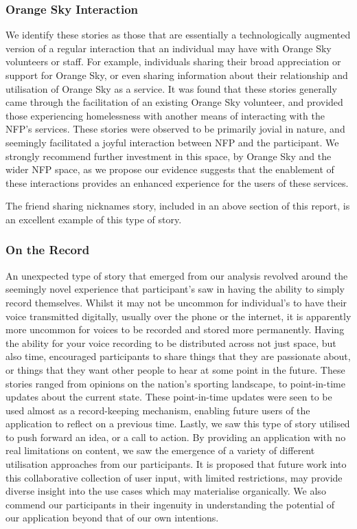 \subsubsection{Orange Sky Interaction}

We identify these stories as those that are essentially a technologically augmented version of a regular interaction that an individual may have with Orange Sky volunteers or staff. For example, individuals sharing their broad appreciation or support for Orange Sky, or even sharing information about their relationship and utilisation of Orange Sky as a service. It was found that these stories generally came through the facilitation of an existing Orange Sky volunteer, and provided those experiencing homelessness with another means of interacting with the NFP's services. These stories were observed to be primarily jovial in nature, and seemingly facilitated a joyful interaction between NFP and the participant. We strongly recommend further investment in this space, by Orange Sky and the wider NFP space, as we propose our evidence suggests that the enablement of these interactions provides an enhanced experience for the users of these services.

The friend sharing nicknames story, included in an above section of this report, is an excellent example of this type of story.

\subsubsection{On the Record}

An unexpected type of story that emerged from our analysis revolved around the seemingly novel experience that participant's saw in having the ability to simply record themselves. Whilst it may not be uncommon for individual's to have their voice transmitted digitally, usually over the phone or the internet, it is apparently more uncommon for voices to be recorded and stored more permanently. Having the ability for your voice recording to be distributed across not just space, but also time, encouraged participants to share things that they are passionate about, or things that they want other people to hear at some point in the future. These stories ranged from opinions on the nation's sporting landscape, to point-in-time updates about the current state. These point-in-time updates were seen to be used almost as a record-keeping mechanism, enabling future users of the application to reflect on a previous time. Lastly, we saw this type of story utilised to push forward an idea, or a call to action. By providing an application with no real limitations on content, we saw the emergence of a variety of different utilisation approaches from our participants. It is proposed that future work into this collaborative collection of user input, with limited restrictions, may provide diverse insight into the use cases which may materialise organically. We also commend our participants in their ingenuity in understanding the potential of our application beyond that of our own intentions.

